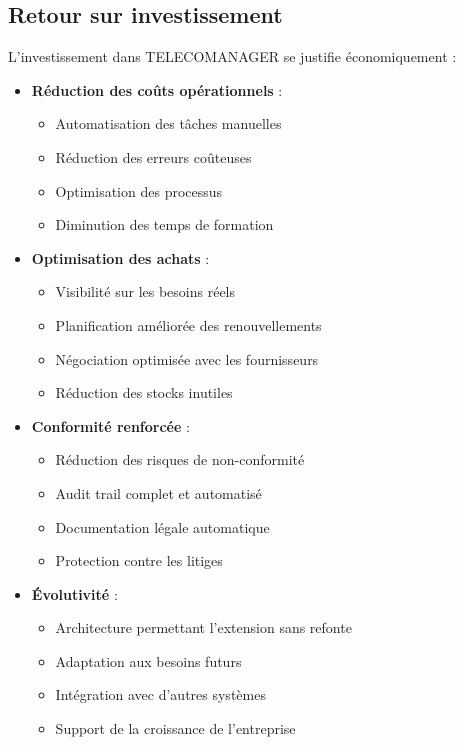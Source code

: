 \documentclass[12pt,a4paper]{report}
\begin{document}
\subsection{Retour sur investissement}
L'investissement dans TELECOMANAGER se justifie économiquement :

\begin{itemize}

\item \textbf{Réduction des coûts opérationnels} : 
  \begin{itemize}
  \item Automatisation des tâches manuelles
  \item Réduction des erreurs coûteuses
  \item Optimisation des processus
  \item Diminution des temps de formation
  \end{itemize}

\item \textbf{Optimisation des achats} : 
  \begin{itemize}
  \item Visibilité sur les besoins réels
  \item Planification améliorée des renouvellements
  \item Négociation optimisée avec les fournisseurs
  \item Réduction des stocks inutiles
  \end{itemize}

\item \textbf{Conformité renforcée} : 
  \begin{itemize}
  \item Réduction des risques de non-conformité
  \item Audit trail complet et automatisé
  \item Documentation légale automatique
  \item Protection contre les litiges
  \end{itemize}

\item \textbf{Évolutivité} : 
  \begin{itemize}
  \item Architecture permettant l'extension sans refonte
  \item Adaptation aux besoins futurs
  \item Intégration avec d'autres systèmes
  \item Support de la croissance de l'entreprise
  \end{itemize}
\end{itemize}
\end{document}
